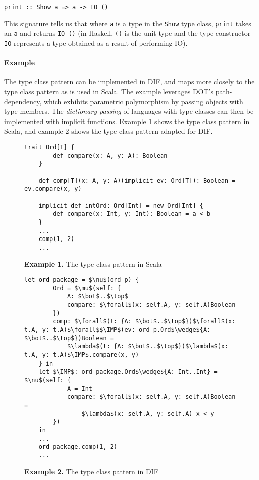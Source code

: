 \begin{lstlisting}[mathescape]
    print :: Show a => a -> IO ()
\end{lstlisting}

\noindent This signature tells us that where \texttt{a} is a type in the
\texttt{Show} type class, \texttt{print} takes an \texttt{a} and returns
\texttt{IO ()} (in Haskell, \texttt{()} is the unit type and the type
constructor \texttt{IO} represents a type obtained as a result of performing
IO).


\paragraph{Example} The type class pattern \cite{OBLB18} can be implemented in
DIF, and maps more closely to the type class pattern as is used in Scala. The
example leverages DOT's path-dependency, which exhibits parametric polymorphism
by passing objects with type members. The \emph{dictionary passing} of languages
with type classes can then be implemented with implicit functions. Example 1
shows the type class pattern in Scala, and example 2 shows the type class
pattern adapted for DIF.

\begin{figure*}[h]
\begin{lstlisting}[mathescape]
    trait Ord[T] {
        def compare(x: A, y: A): Boolean
    }

    def comp[T](x: A, y: A)(implicit ev: Ord[T]): Boolean = ev.compare(x, y)

    implicit def intOrd: Ord[Int] = new Ord[Int] {
        def compare(x: Int, y: Int): Boolean = a < b
    }
    ...
    comp(1, 2)
    ...
\end{lstlisting}
\caption*{\textbf{Example 1.} The type class pattern in Scala}
\end{figure*}

\begin{figure*}[h]
\begin{lstlisting}[mathescape]
    let ord_package = $\nu$(ord_p) {
        Ord = $\mu$(self: {
            A: $\bot$..$\top$
            compare: $\forall$(x: self.A, y: self.A)Boolean
        })
        comp: $\forall$(t: {A: $\bot$..$\top$})$\forall$(x: t.A, y: t.A)$\forall$$\IMP$(ev: ord_p.Ord$\wedge${A: $\bot$..$\top$})Boolean =
            $\lambda$(t: {A: $\bot$..$\top$})$\lambda$(x: t.A, y: t.A)$\IMP$.compare(x, y)
    } in
    let $\IMP$: ord_package.Ord$\wedge${A: Int..Int} = $\nu$(self: {
            A = Int
            compare: $\forall$(x: self.A, y: self.A)Boolean =
                $\lambda$(x: self.A, y: self.A) x < y
        })
    in
    ...
    ord_package.comp(1, 2)
    ...
\end{lstlisting}
\caption*{\textbf{Example 2.} The type class pattern in DIF}
\end{figure*}
